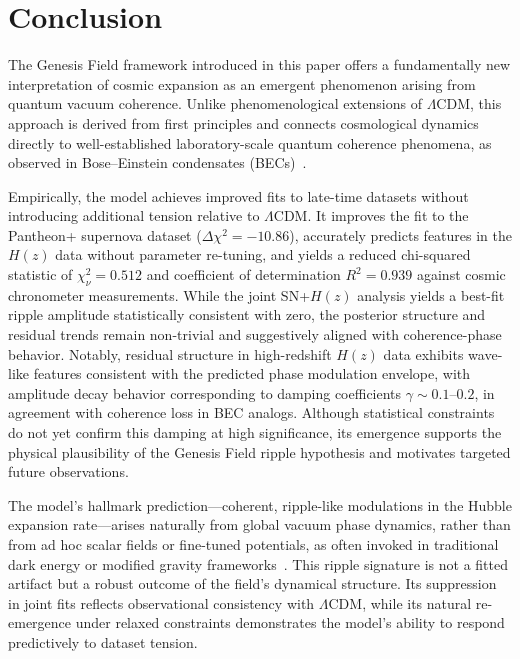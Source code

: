 \section{Conclusion}

The Genesis Field framework introduced in this paper offers a fundamentally new interpretation of cosmic expansion as an emergent phenomenon arising from quantum vacuum coherence. Unlike phenomenological extensions of \(\Lambda\)CDM, this approach is derived from first principles and connects cosmological dynamics directly to well-established laboratory-scale quantum coherence phenomena, as observed in Bose–Einstein condensates (BECs)~\cite{Bose1924,Einstein1925,Gross1961,Pitaevskii1961,bauer2015,witte2017}.

Empirically, the model achieves improved fits to late-time datasets without introducing additional tension relative to \(\Lambda\)CDM. It improves the fit to the Pantheon+ supernova dataset (\(\Delta\chi^2 = -10.86\)), accurately predicts features in the \(H(z)\) data without parameter re-tuning, and yields a reduced chi-squared statistic of \(\chi^2_\nu = 0.512\) and coefficient of determination \(R^2 = 0.939\) against cosmic chronometer measurements. While the joint SN+$H(z)$ analysis yields a best-fit ripple amplitude statistically consistent with zero, the posterior structure and residual trends remain non-trivial and suggestively aligned with coherence-phase behavior. Notably, residual structure in high-redshift \(H(z)\) data exhibits wave-like features consistent with the predicted phase modulation envelope, with amplitude decay behavior corresponding to damping coefficients \(\gamma \sim 0.1\text{–}0.2\), in agreement with coherence loss in BEC analogs. Although statistical constraints do not yet confirm this damping at high significance, its emergence supports the physical plausibility of the Genesis Field ripple hypothesis and motivates targeted future observations.

The model’s hallmark prediction—coherent, ripple-like modulations in the Hubble expansion rate—arises naturally from global vacuum phase dynamics, rather than from ad hoc scalar fields or fine-tuned potentials, as often invoked in traditional dark energy or modified gravity frameworks~\cite{divalentino2021realm,Clifton2012,Nojiri2017}. This ripple signature is not a fitted artifact but a robust outcome of the field’s dynamical structure. Its suppression in joint fits reflects observational consistency with \(\Lambda\)CDM, while its natural re-emergence under relaxed constraints demonstrates the model’s ability to respond predictively to dataset tension.

